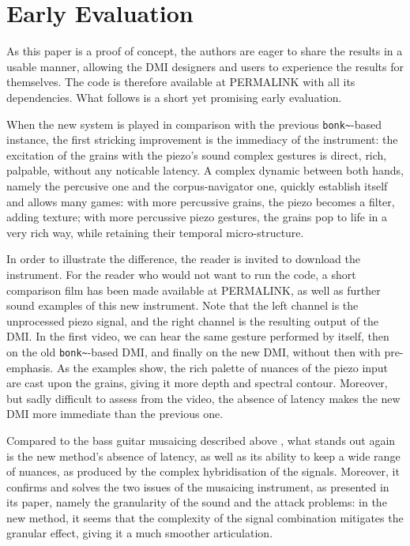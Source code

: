 \section{Early Evaluation}\label{sec:eval}

As this paper is a proof of concept, the authors are eager to share the results in a usable manner, allowing the DMI designers and users to experience the results for themselves. The code is therefore available at PERMALINK with all its dependencies. What follows is a short yet promising early evaluation.

When the new system is played in comparison with the previous \verb|bonk~|-based instance, the first stricking improvement is the immediacy of the instrument: the excitation of the grains with the piezo's sound complex gestures is direct, rich, palpable, without any noticable latency. A complex dynamic between both hands, namely the percusive one and the corpus-navigator one, quickly establish itself and allows many games: with more percussive grains, the piezo becomes a filter, adding texture; with more percussive piezo gestures, the grains pop to life in a very rich way, while retaining their temporal micro-structure.

In order to illustrate the difference, the reader is invited to download the instrument. For the reader who would not want to run the code, a short comparison film has been made available at PERMALINK, as well as further sound examples of this new instrument. Note that the left channel is the unprocessed piezo signal, and the right channel is the resulting output of the DMI. In the first video, we can hear the same gesture performed by itself, then on the old \verb|bonk~|-based DMI, and finally on the new DMI, without then with pre-emphasis. As the examples show, the rich palette of nuances of the piezo input are cast upon the grains, giving it more depth and spectral contour. Moreover, but sadly difficult to assess from the video, the absence of latency makes the new DMI more immediate than the previous one.

Compared to the bass guitar musaicing described above \cite{TremblaySchwarz-nime2010-surfing-the-waves}, what stands out again is the new method's absence of latency, as well as its ability to keep a wide range of nuances, as produced by the complex hybridisation of the signals. Moreover, it confirms and solves the two issues of the musaicing instrument, as presented in its paper, namely the granularity of the sound and the attack problems: in the new method, it seems that the complexity of the signal combination mitigates the granular effect, giving it a much smoother articulation.
